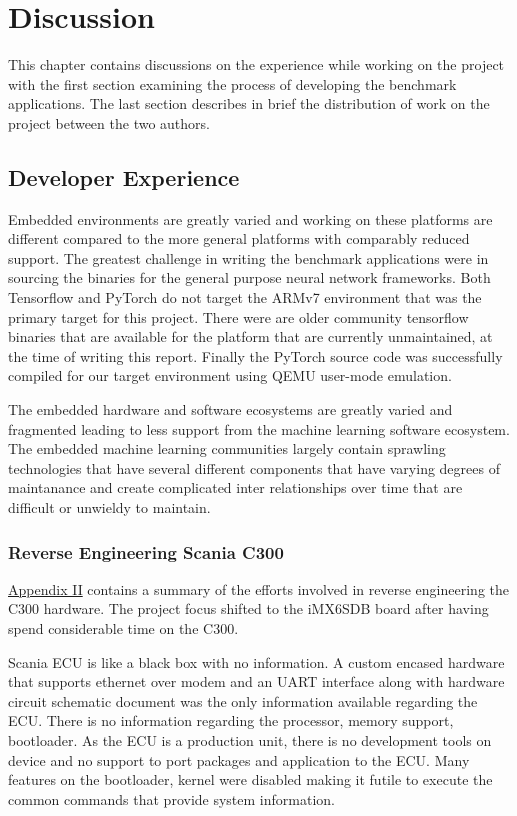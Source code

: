 
\chapter{Discussion}

This chapter contains discussions on the experience while working on the project with the first section examining the process of developing the benchmark applications. The last section describes in brief the distribution of work on the project between the two authors.

\section{Developer Experience}

Embedded environments are greatly varied and working on these platforms are different compared to the more general platforms with comparably reduced support. The greatest challenge in writing the benchmark applications were in sourcing the binaries for the general purpose neural network frameworks. Both Tensorflow and PyTorch do not target the ARMv7 environment that was the primary target for this project. There were are older community tensorflow binaries that are available for the platform that are currently unmaintained, at the time of writing this report. Finally the PyTorch source code was successfully compiled for our target environment using QEMU user-mode emulation.

The embedded hardware and software ecosystems are greatly varied and fragmented leading to less support from the machine learning software ecosystem. The embedded machine learning communities largely contain sprawling technologies that have several different components that have varying degrees of maintanance and create complicated inter relationships over time that are difficult or unwieldy to maintain.

\subsection{Reverse Engineering Scania C300}

\hyperref[rtc-c300]{Appendix II} contains a summary of the efforts involved in reverse engineering the C300 hardware. The project focus shifted to the iMX6SDB board after having spend considerable time on the C300.

Scania ECU is like a black box with no information. A custom encased hardware that supports ethernet over modem and an UART interface along with hardware circuit schematic document was the only information available regarding the ECU. There is no information regarding the processor,  memory support, bootloader. As the ECU is a production unit, there is no development tools on device and no support to port packages and application to the ECU. Many features on the bootloader, kernel were disabled making it futile to execute the common commands that provide system information.

